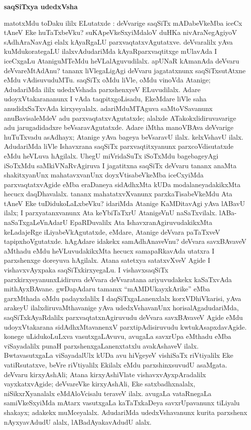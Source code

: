 \smallskip
\begin{center}
{\Large\bf saqSiTxya udedxVsha}
\end{center}

matotxMdu toDaku ililx ELutatxde : deVvarige saqSiTx mADabeVkeMba iceCx tAneV Eke huTaTxbeVku? suKApeVkeSxyiMdaloV duHKa nivAraNegAgiyoV sAdhAraNavAgi elalx kAyaRgaLU parxvaqtatxvAgutatxve. deVvaralilx yAva kuMdukorategaLU ilalxvAduda\-riMda kAyaRparxvaqtitxge mUlavAda I iceCxgaLu AtaniguMTeMdu heVLalAguvudilalx. apUNaR kAmanAda deVvaru deVvareMtAdAnu? tananx liVlegaLigAgi deVvaru jagatatxnunx saqSiTxsutAtxne eMdu vAdisuvuduMTu. saqSiTx oMdu liVle, oMdu vinoVda Atanige; AdudariMda ililx udedxVshada parxshenxyeV ELuvudilalx. Adare udoyxVtakarananunx I vAda taqpitxgoLisadu, EkeMdare liVle saha anudidxSaTxvAda kirxyeyalalx. adariMduMTAguva saMtoVSavanunx anuBavisaleMdeV adu parxvaqtatxvAgutatxde; alalxde ATakokxlidiruvavarige adu jarugadidadxre beVsaravAgutatxde. Adare iMtha manoVBAva deVvarige huTuTxvadu asAdhayx; Atanige yAva bageya beVsaravU ilalx. kelxVshavU ilalx. AdudariMda liVle Ishavxrana saqSiTx parxvaqtitxyanunx parxcoVdisutatxde eMdu heVLuva hAgilalx. UhegU miVridaSuTx iSoTxMdu bagebageyAgi iSoTxMdu saMkiVNaRvAgiruva I jagatitxna saqSiTx deVvaru tananx anaMta shakitxyanUnx mahatavxvanUnx doyxVtisabeVkeMba iceCxyiMda parxvaqtatxvAgide eMba eraDaneya sidAdhxMta kUDa modalaneyadakikxMta hecucx daqDhavalalx. tananx mahatatxvXvanunx parxkaTisabeVkeMdu Ata tAneV Eke tuDidukoLaLxbeVku? idariMda Atanige KaMDitavAgi yAva lABavU ilalx; I parxyatanxvanunx Ata keYbiTaTxrU AtanigeVnU naSaTxvilalx. lABa-naSaTxgaLeVnAdarU EpaRDuvalilx Ata IshavxranAgiruvudakikxMta keLadajeRge iLiyabeVkAgutatxde, eMdare, Atanige deVvara paTaTxveV tapipxhoVgutatxde. hAgAdare idakekx samAdhAnaveVnu? deVvara savxBAvaveV aMthadu eMdu heVLuvudakikxMta hecucx samapaRkavAda utatxra I parxshenxge doreyuva hAgilalx. Atana satetxya satatxvXveV Agide I vishavxvAyxpaka saqSiTxkirxyegaLu. I vishavxsaqSiTx parxkirxyeyanunxLidiruva deVvara deVvaratana ariyuvudakekx kaSaTxvAda mithAyxBAvane. gwDapAdaru tamamx ``mAMDUkayxkArike'' eMba garxMthada oMdu padayxdalilx I daqSiTxgaLanenxlalx korxVDhiVkarisi, yAva arakeyU ilalxdiruvaMthavanige yAva udedxVshavanUnx horisalAgadudariMda, saqSiTxkAyaRdalilx parxvaqtatxnAgiruvudu deVvara savxBAvaveV Agide eMdu udoyxVtakarana sidAdhxMtavanenxV parxtipAdisiruvudu kwtukAsapxdavAgide. konege uLidukoLuLxva vasutxgaLAvuvu, avugaLa savxrUpa eMthadu eMba viSayadalilx punaH parxshenxgaLanenxtatxlu avakAshaveV ilalx. BwtavasutxgaLa viSayadalUlx kUDa avu hiVgeyeV vishiSaTx riVtiyalilx Eke vatiRsutatxve, beVre riVtiyalilx Ekilalx eMdu parxshinxsuvudU asaMgata. deVvaru kirxyAshAli; Atana kirxyAshiVlate vishavxvAyxpAradalilx vayxkatxvAgide; deVvareVke kirxyAshAli, Eke satxbadhxnalalx, niSikxrXyanalalx eMdAloVcisalu teraveV ilalx. avugaLa vataRnegaLa samiVkeSxyiMda mAtarx vasutxgaLa kaTaTxkaDeya savxrUpavanunx tiLiyalu shakayx; adakekx muMceyalalx. AdudariMda udedxVshavanunx kurita parxshenx nAyxyavAdudU alalx, lABadAyakavAdudU alalx.

